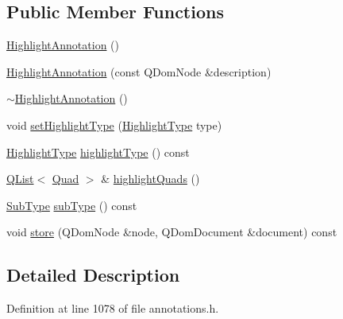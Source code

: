 \subsection*{Public Member Functions}
\begin{DoxyCompactItemize}
\item 
\hyperlink{classOkular_1_1HighlightAnnotation_aa4225ec6a5811b7dfda9575424233dc4}{Highlight\+Annotation} ()
\item 
\hyperlink{classOkular_1_1HighlightAnnotation_a860c26f49020ced5bd628450537ab5ce}{Highlight\+Annotation} (const Q\+Dom\+Node \&description)
\item 
\hyperlink{classOkular_1_1HighlightAnnotation_a9d92c42bb9937fdda0cdb6bcd1b51768}{$\sim$\+Highlight\+Annotation} ()
\item 
void \hyperlink{classOkular_1_1HighlightAnnotation_af02dd3d33472c9e903fea2e4a58363c4}{set\+Highlight\+Type} (\hyperlink{classOkular_1_1HighlightAnnotation_a63d2488735d1d6320e2e118743243999}{Highlight\+Type} type)
\item 
\hyperlink{classOkular_1_1HighlightAnnotation_a63d2488735d1d6320e2e118743243999}{Highlight\+Type} \hyperlink{classOkular_1_1HighlightAnnotation_a3e95972aebea730877a033f8b2908b90}{highlight\+Type} () const 
\item 
\hyperlink{classQList}{Q\+List}$<$ \hyperlink{classOkular_1_1HighlightAnnotation_1_1Quad}{Quad} $>$ \& \hyperlink{classOkular_1_1HighlightAnnotation_ac0099fec5f383ea7296b86db15b6c08c}{highlight\+Quads} ()
\item 
\hyperlink{classOkular_1_1Annotation_af71b46e37d5f850b97d5c4de3be9aac0}{Sub\+Type} \hyperlink{classOkular_1_1HighlightAnnotation_a4c897125cc4ca653dd9e8c6879a7321f}{sub\+Type} () const 
\item 
void \hyperlink{classOkular_1_1HighlightAnnotation_ae0fb83f294770aef2d1dc1bb02c7972b}{store} (Q\+Dom\+Node \&node, Q\+Dom\+Document \&document) const 
\end{DoxyCompactItemize}


\subsection{Detailed Description}


Definition at line 1078 of file annotations.\+h.




